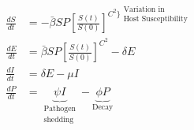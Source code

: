 \documentclass[10pt]{article}
\begin{document}
\[\begin{aligned}
\frac{dS}{dt} &= -\bar{\beta} S P \left[ \frac{S(t)}{S(0)} \right] ^ {C^{2}\Big\}\substack{\text{Variation in} \\ \text{Host Susceptibility}}} \\
\frac{dE}{dt} &= \bar{\beta} S P \left[ \frac{S(t)}{S(0)} \right] ^ {C^{2}} - \delta E \\
\frac{dI}{dt} &= \delta E - \mu I \\
\frac{dP}{dt} &= \underbrace{\psi I}_{\substack{\text{Pathogen}\\ \text{shedding}}} - \underbrace{\phi P}_{\text{Decay}}
\end{aligned}
\]
\end{document}

